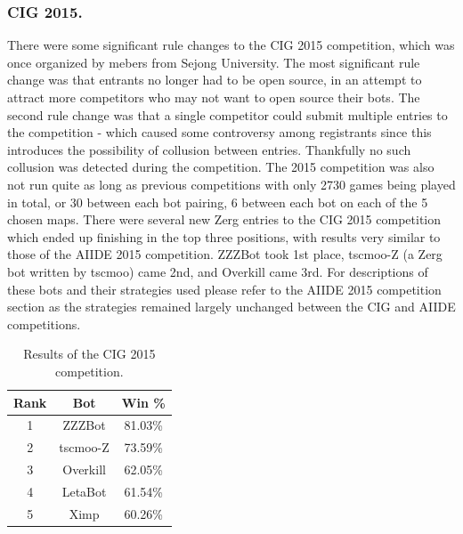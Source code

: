 \documentclass{llncs}
\begin{document}
\subsubsection{CIG 2015.}
There were some significant rule changes to the CIG 2015 competition, which was once organized by mebers from Sejong University. The most significant rule change was that entrants no longer had to be open source, in an attempt to attract more competitors who may not want to open source their bots. The second rule change was that a single competitor could submit multiple entries to the competition - which caused some controversy among registrants since this introduces the possibility of collusion between entries. Thankfully no such collusion was detected during the competition. The 2015 competition was also not run quite as long as previous competitions with only 2730 games being played in total, or 30 between each bot pairing, 6 between each bot on each of the 5 chosen maps. There were several new Zerg entries to the CIG 2015 competition which ended up finishing in the top three positions, with results very similar to those of the AIIDE 2015 competition. ZZZBot took 1st place, tscmoo-Z (a Zerg bot written by tscmoo) came 2nd, and Overkill came 3rd. For descriptions of these bots and their strategies used please refer to the AIIDE 2015 competition section as the strategies remained largely unchanged between the CIG and AIIDE competitions. 

\begin{table}[t]
\caption{Results of the CIG 2015 competition.}
\label{tab:cig2015}
\centering
\begin{tabular}{|c|c|c|}
\hline
{\bfseries Rank} & {\bfseries Bot} & {\bfseries Win \%} \\
\hline
1 & ZZZBot & 81.03\% \\
2 & tscmoo-Z & 73.59\% \\
3 & Overkill & 62.05\% \\
4 & LetaBot & 61.54\% \\
5 & Ximp & 60.26\% \\ 
\hline
\end{tabular}
\end{table}
\end{document}
